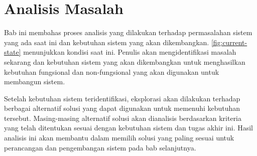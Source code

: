 \chapter{Analisis Masalah}
\label{chap:analisis-masalah}
Bab ini membahas proses analisis yang dilakukan terhadap permasalahan sistem yang ada saat ini dan kebutuhan sistem yang akan dikembangkan. \autoref{fig:current-state} menunjukkan kondisi saat ini. Penulis akan mengidentifikasi masalah sekarang dan kebutuhan sistem yang akan dikembangkan untuk menghasilkan kebutuhan fungsional dan non-fungsional yang akan digunakan untuk membangun sistem. 

Setelah kebutuhan sistem teridentifikasi, eksplorasi akan dilakukan terhadap berbagai alternatif solusi yang dapat digunakan untuk memenuhi kebutuhan tersebut. Masing-masing alternatif solusi akan dianalisis berdasarkan kriteria yang telah ditentukan sesuai dengan kebutuhan sistem dan tugas akhir ini. Hasil analisis ini akan membantu dalam memilih solusi yang paling sesuai untuk perancangan dan pengembangan sistem pada bab selanjutnya.






